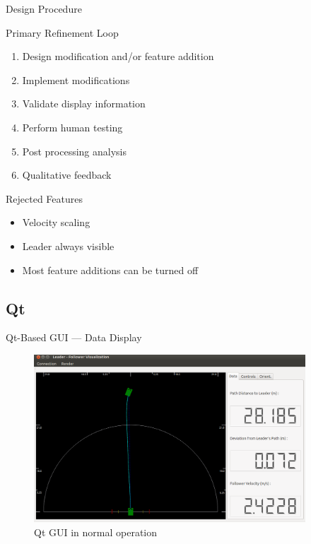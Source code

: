 \documentclass{beamer}
\begin{document}
    \begin{frame}{Design Procedure}

      Primary Refinement Loop
      \begin{enumerate} \footnotesize
        \item Design modification and/or feature addition
        \item Implement modifications
        \item Validate display information
        \item Perform human testing
        \item Post processing analysis
        \item Qualitative feedback
      \end{enumerate}        

      Rejected Features
      \begin{itemize}
        \item Velocity scaling
        \item Leader always visible
        \item Most feature additions can be turned off
      \end{itemize}

    \end{frame}



  \subsection{Qt}

    \begin{frame}{Qt-Based GUI --- Data Display}
      \begin{figure}[ht] \centering
        \includegraphics[width=4in] {../graphics/final_design_data.png}
        \caption{Qt GUI in normal operation} \label{fig:qt_data_display}
      \end{figure}
    \end{frame}
\end{document}
